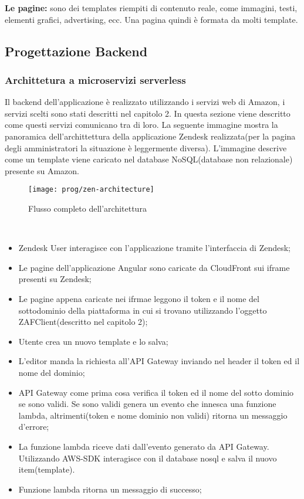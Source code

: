 \textbf{Le pagine:} sono dei templates riempiti di contenuto reale, come immagini, testi, elementi grafici, advertising, ecc. Una pagina quindi è formata da molti template. 
\newpage
\subsection{Progettazione Backend}
\subsubsection{Archittetura a microservizi serverless}
Il backend dell'applicazione è realizzato utilizzando i servizi web di Amazon, i servizi scelti sono stati descritti nel capitolo 2. In questa sezione viene descritto come questi servizi comunicano tra di loro. La seguente immagine mostra la panoramica dell'archittettura della applicazione Zendesk realizzata(per la pagina degli amministratori la situazione è leggermente diversa). L'immagine descrive come un template viene caricato nel database NoSQL(database non relazionale) presente su Amazon. 
\begin{figure}[!h] 
	\centering 
	\texttt{[image: prog/zen-architecture]} 
	\caption{Flusso completo dell'architettura}
\end{figure} 
\\
\begin{itemize}
	\item Zendesk User interagisce con l'applicazione tramite l'interfaccia di Zendesk;
	\item Le pagine dell'applicazione Angular sono caricate da CloudFront sui iframe presenti su Zendesk;
	\item Le pagine appena caricate nei ifrmae leggono il token e il nome del sottodominio della piattaforma in cui si trovano utilizzando l'oggetto ZAFClient(descritto nel capitolo 2);
	\item Utente crea un nuovo template e lo salva;
	\item L'editor manda la richiesta all'API Gateway inviando nel header il token ed il nome del dominio;
	\item API Gateway come prima cosa verifica il token ed il nome del sotto dominio se sono validi. Se sono validi genera un evento che innesca una funzione lambda, altrimenti(token e nome dominio non validi) ritorna un messaggio d'errore;
	\item La funzione lambda riceve dati dall'evento generato da API Gateway. Utilizzando AWS-SDK interagisce con il database nosql e salva il nuovo item(template).
	\item Funzione lambda ritorna un messaggio di successo;
\end{itemize}
